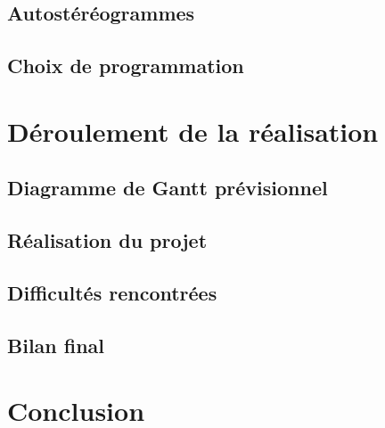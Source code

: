 \documentclass[paper=a4, fontsize=12pt]{article}
\newenvironment{changemargin}[2]{\begin{list}{}{%
      \setlength{\topsep}{0pt}%
      \setlength{\leftmargin}{0pt}%
      \setlength{\rightmargin}{0pt}%
      \setlength{\listparindent}{\parindent}%
      \setlength{\itemindent}{\parindent}%
      \setlength{\parsep}{0pt plus 1pt}%
      \addtolength{\leftmargin}{#1}%
      \addtolength{\rightmargin}{#2}%
    }\item }{\end{list}}
\numberwithin{equation}{section}		%
\numberwithin{figure}{section}			%
\numberwithin{table}{section}				%
\begin{document}
\begin{changemargin}{-1cm}{-1cm}
  \subsection{Autostéréogrammes}
  
  \subsection{Choix de programmation}
  
  \newpage
  
  \section{Déroulement de la réalisation}
  \subsection{Diagramme de Gantt prévisionnel}
  
  \subsection{Réalisation du projet}
  
  \subsection{Difficultés rencontrées}
  
  \subsection{Bilan final}
  
  \newpage

  \section{Conclusion}
  
  \newpage

  
  

\end{changemargin}

\end{document}
